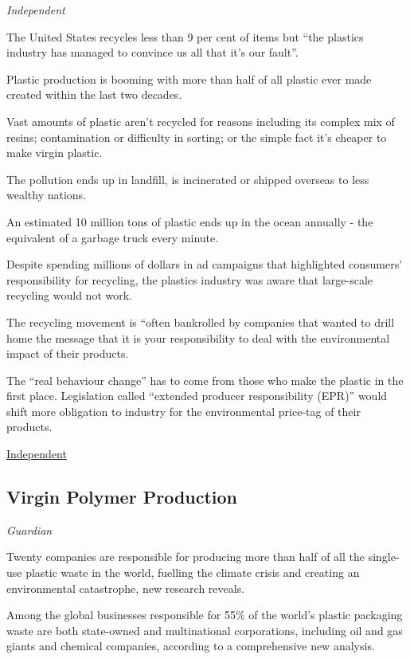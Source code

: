 \documentclass[
]{book}
\begin{document}
\emph{Independent}

The United States recycles less than 9 per cent of items
but ``the plastics industry has managed to convince us all that it's our fault''.

Plastic production is booming with more than half of all plastic ever made
created within the last two decades.

Vast amounts of plastic aren't recycled for reasons including its complex mix of resins;
contamination or difficulty in sorting; or the simple fact it's cheaper to make virgin plastic.

The pollution ends up in landfill, is incinerated or shipped overseas to less wealthy nations.

An estimated 10 million tons of plastic ends up in the ocean annually -
the equivalent of a garbage truck every minute.

Despite spending millions of dollars in ad campaigns that highlighted consumers' responsibility for recycling, the plastics industry was aware that large-scale recycling would not work.

The recycling movement is ``often bankrolled by companies that wanted to drill home
the message that it is your responsibility
to deal with the environmental impact of their products.

The ``real behaviour change'' has to come from those who make the plastic in the first place.
Legislation called ``extended producer responsibility (EPR)''
would shift more obligation to industry for the environmental price-tag of their products.

\href{https://www.independent.co.uk/climate-change/news/john-oliver-plastics-recycling-b1820614.html}{Independent}

\hypertarget{virgin-polymer-production}{%
\subsection{Virgin Polymer Production}\label{virgin-polymer-production}}

\emph{Guardian}

Twenty companies are responsible for producing more than half of all the single-use plastic waste in the world, fuelling the climate crisis and creating an environmental catastrophe, new research reveals.

Among the global businesses responsible for 55\% of the world's plastic packaging waste are both state-owned and multinational corporations, including oil and gas giants and chemical companies, according to a comprehensive new analysis.
\end{document}
